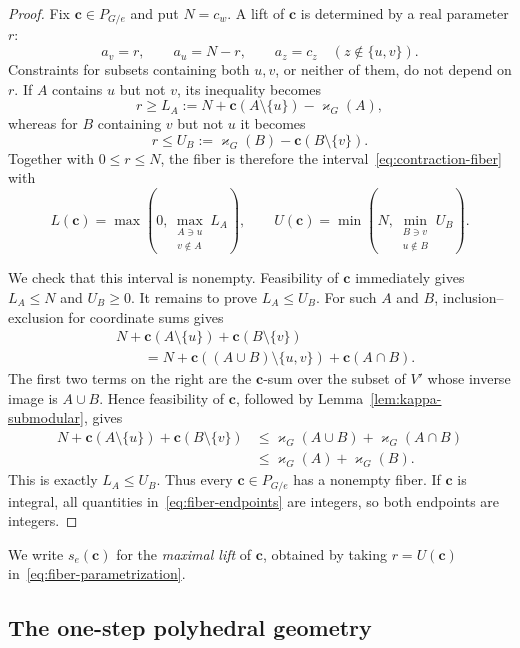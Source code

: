 \documentclass[11pt]{article}
\theoremstyle{plain}
\theoremstyle{definition}
\newcommand{\bc}{\mathbf{c}}
\newcommand{\kp}{\varkappa}
\numberwithin{equation}{section}
\begin{document}
\begin{proof}
Fix $\bc\in P_{G/e}$ and put $N=c_w$.  A lift of $\bc$ is determined by a real
parameter $r$:
\begin{equation}
   a_v=r,\qquad a_u=N-r,
   \qquad a_z=c_z\quad(z\notin\{u,v\}).
\label{eq:fiber-parametrization}
\end{equation}
Constraints for subsets containing both $u,v$, or neither of them, do not
depend on $r$.  If $A$ contains $u$ but not $v$, its inequality becomes
\[
   r\ge L_A:=N+\bc(A\setminus\{u\})-\kp_G(A),
\]
whereas for $B$ containing $v$ but not $u$ it becomes
\[
   r\le U_B:=\kp_G(B)-\bc(B\setminus\{v\}).
\]
Together with $0\le r\le N$, the fiber is therefore the
interval~\eqref{eq:contraction-fiber} with
\begin{equation}
 L(\bc)=\max\!\left(0,
       \max_{\substack{A\ni u\\v\notin A}}L_A\right),
 \qquad
 U(\bc)=\min\!\left(N,
       \min_{\substack{B\ni v\\u\notin B}}U_B\right).
\label{eq:fiber-endpoints}
\end{equation}

We check that this interval is nonempty.  Feasibility of $\bc$ immediately gives
$L_A\le N$ and $U_B\ge 0$.  It remains to prove $L_A\le U_B$.  For such $A$
and $B$, inclusion--exclusion for coordinate sums gives
\begin{align*}
 &N+\bc(A\setminus\{u\})+\bc(B\setminus\{v\})\\
 &\qquad =N+\bc((A\cup B)\setminus\{u,v\})+\bc(A\cap B).
\end{align*}
The first two terms on the right are the $\bc$-sum over the subset of $V'$
whose inverse image is $A\cup B$.  Hence feasibility of $\bc$, followed by
Lemma~\ref{lem:kappa-submodular}, gives
\begin{align*}
 N+\bc(A\setminus\{u\})+\bc(B\setminus\{v\})
 &\le \kp_G(A\cup B)+\kp_G(A\cap B)\\
 &\le \kp_G(A)+\kp_G(B).
\end{align*}
This is exactly $L_A\le U_B$.  Thus every $\bc\in P_{G/e}$ has a nonempty fiber.
If $\bc$ is integral, all quantities in~\eqref{eq:fiber-endpoints} are integers,
so both endpoints are integers.
\end{proof}

We write $s_e(\bc)$ for the \emph{maximal lift} of $\bc$, obtained by taking $r=U(\bc)$ in~\eqref{eq:fiber-parametrization}.

\subsection{The one-step polyhedral geometry}
\label{subsec:one-step-polyhedral}
\end{document}
